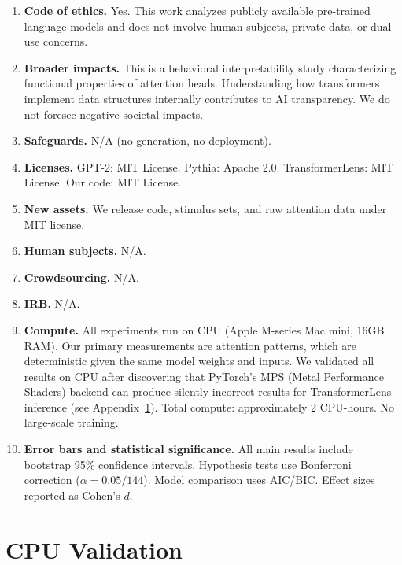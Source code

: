 \documentclass[11pt]{article}
\begin{document}
\begin{enumerate}
\item \textbf{Code of ethics.} Yes. This work analyzes publicly available pre-trained language models and does not involve human subjects, private data, or dual-use concerns.

\item \textbf{Broader impacts.} This is a behavioral interpretability study characterizing functional properties of attention heads. Understanding how transformers implement data structures internally contributes to AI transparency. We do not foresee negative societal impacts.

\item \textbf{Safeguards.} N/A (no generation, no deployment).

\item \textbf{Licenses.} GPT-2: MIT License. Pythia: Apache 2.0. TransformerLens: MIT License. Our code: MIT License.

\item \textbf{New assets.} We release code, stimulus sets, and raw attention data under MIT license.

\item \textbf{Human subjects.} N/A.

\item \textbf{Crowdsourcing.} N/A.

\item \textbf{IRB.} N/A.

\item \textbf{Compute.} All experiments run on CPU (Apple M-series Mac mini, 16GB RAM). Our primary measurements are attention patterns, which are deterministic given the same model weights and inputs. We validated all results on CPU after discovering that PyTorch's MPS (Metal Performance Shaders) backend can produce silently incorrect results for TransformerLens inference (see Appendix~\ref{app:cpu_validation}). Total compute: approximately 2 CPU-hours. No large-scale training.

\item \textbf{Error bars and statistical significance.} All main results include bootstrap 95\% confidence intervals. Hypothesis tests use Bonferroni correction ($\alpha = 0.05/144$). Model comparison uses AIC/BIC. Effect sizes reported as Cohen's $d$.

\end{enumerate}

\section{CPU Validation}
\label{app:cpu_validation}
\end{document}
